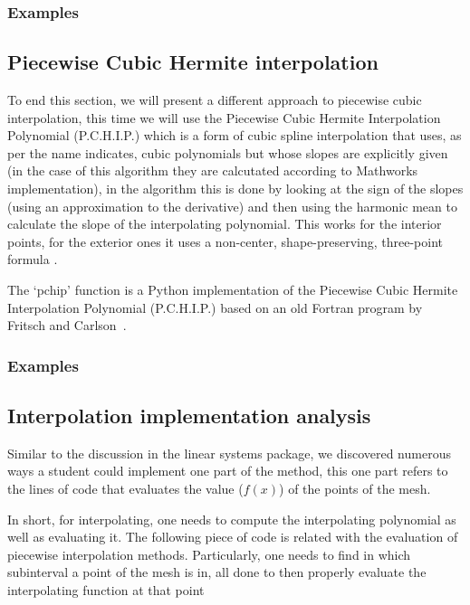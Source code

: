 \subsubsection{Examples}



\subsection{Piecewise Cubic Hermite interpolation}
To end this section, we will present a different approach to piecewise cubic interpolation, this time we will use the Piecewise Cubic Hermite Interpolation Polynomial (P.C.H.I.P.) which is a form of cubic spline interpolation that uses, as per the name indicates, cubic polynomials but whose slopes are explicitly given (in the case of this algorithm they are calcutated according to Mathworks implementation), in the algorithm this is done by looking at the sign of the slopes (using an approximation to the derivative) and then using the harmonic mean to calculate the slope of the interpolating polynomial. This works for the interior points, for the exterior ones it uses a non-center, shape-preserving, three-point formula . 

The `pchip' function is a Python implementation of the Piecewise Cubic Hermite Interpolation Polynomial (P.C.H.I.P.) based on an old Fortran program by Fritsch and Carlson~\cite{doi:10.1137/0717021}.

\subsubsection{Examples}
	



\subsection{Interpolation implementation analysis}

Similar to the discussion in the linear systems package, we discovered numerous ways a student could implement one part of the method, this one part refers to the lines of code that evaluates the value ($f(x)$) of the points of the mesh. 

In short, for interpolating, one needs to compute the interpolating polynomial as well as evaluating it. The following piece of code is related with the evaluation of piecewise interpolation methods. Particularly, one needs to find in which subinterval a point of the mesh is in, all done to then properly evaluate the interpolating function at that point

